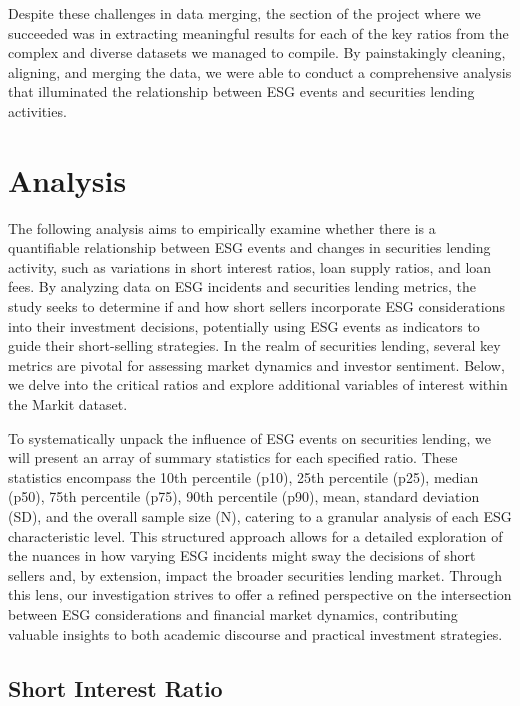 Despite these challenges in data merging, the section of the project where we succeeded was in extracting meaningful results for each of the key ratios from the complex and diverse datasets we managed to compile. By painstakingly cleaning, aligning, and merging the data, we were able to conduct a comprehensive analysis that illuminated the relationship between ESG events and securities lending activities.



\newpage
\section{Analysis}

The following analysis aims to empirically examine whether there is a quantifiable relationship between ESG events and changes in securities lending activity, such as variations in short interest ratios, loan supply ratios, and loan fees. By analyzing data on ESG incidents and securities lending metrics, the study seeks to determine if and how short sellers incorporate ESG considerations into their investment decisions, potentially using ESG events as indicators to guide their short-selling strategies.  In the realm of securities lending, several key metrics are pivotal for assessing market dynamics and investor sentiment. Below, we delve into the critical ratios and explore additional variables of interest within the Markit dataset.

To systematically unpack the influence of ESG events on securities lending, we will present an array of summary statistics for each specified ratio. These statistics encompass the 10th percentile (p10), 25th percentile (p25), median (p50), 75th percentile (p75), 90th percentile (p90), mean, standard deviation (SD), and the overall sample size (N), catering to a granular analysis of each ESG characteristic level. This structured approach allows for a detailed exploration of the nuances in how varying ESG incidents might sway the decisions of short sellers and, by extension, impact the broader securities lending market. Through this lens, our investigation strives to offer a refined perspective on the intersection between ESG considerations and financial market dynamics, contributing valuable insights to both academic discourse and practical investment strategies.


\subsection{Short Interest Ratio}


